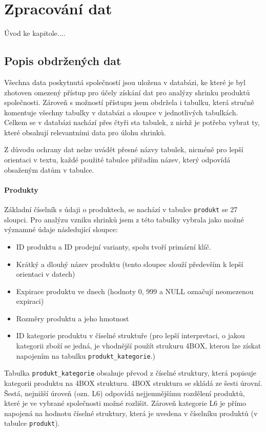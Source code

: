 \chapter{Zpracování dat}

Úvod ke kapitole.... %

\section{Popis obdržených dat}

Všechna data poskytnutá společností jsou uložena v databázi, ke které je byl zhotoven omezený přístup pro účely získání dat pro analýzy shrinku produktů společnosti. Zároveň s možností přístupu jsem obdržela i tabulku, která stručně komentuje všechny tabulky v databázi a sloupce v jednotlivých tabulkách. Celkem se v databázi nachází přes čtyři sta tabulek, z nichž je potřeba vybrat ty, které obsahují relevantními data pro úlohu shrinků.

Z důvodu ochrany dat nelze uvádět přesné názvy tabulek, nicméně pro lepší orientaci v textu, každé použité tabulce přiřadím název, který odpovídá obsaženým datům v tabulce.

\subsubsection{Produkty}

Základní číselník s údaji o produktech, se nachází v tabulce \texttt{produkt} se 27 sloupci. Pro analýzu vzniku shrinků jsem z této tabulky vybrala jako možné významné údaje následující sloupce:
\begin{itemize}
    \item ID produktu a ID prodejní varianty, spolu tvoří primární klíč. 
    \item Krátký a dlouhý název produktu (tento sloupec slouží především k lepší orientaci v datech)
    \item Expirace produktu ve dnech (hodnoty 0, 999 a NULL označují neomezenou expiraci)
    \item Rozměry produktu a jeho hmotnost
    \item ID kategorie produktu v číselné struktuře (pro lepší interpretaci, o jakou kategorii zboží se jedná, je vhodnější použít strukuru 4BOX, kterou lze získat napojením na tabulku \texttt{produkt\_kategorie}.)
\end{itemize}
Tabulka \texttt{produkt\_kategorie} obsahuje převod z číselné struktury, která popisuje kategorii produktu na 4BOX strukturu. 4BOX struktura se skládá ze šesti úrovní. Šestá, nejnižší úroveň (ozn. L6) odpovídá nejjemnějšímu rozdělení produktů, které je ve vybrané společnosti možné rozlišit. Zároveň kategorie L6 je přímo napojená na hodnotu číselné struktury, která je uvedena v číselníku produktů (v tabulce \texttt{produkt}).


